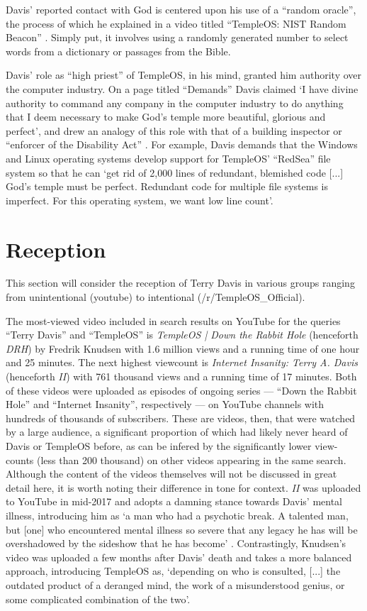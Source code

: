 \documentclass[Draft.tex]{subfiles}
\begin{document}
Davis' reported contact with God is centered upon his use of
a ``random oracle'', the process of which he explained in a video titled
``TempleOS: NIST Random Beacon'' \parencite{NIST}.
Simply put, it involves using a randomly generated number to select
words from a dictionary or passages from the Bible.

Davis' role as ``high priest'' of TempleOS, in his mind, granted him authority
over the computer industry.
On a page titled ``Demands'' Davis claimed
`I have divine authority to command any company in the computer industry
to do anything that I deem necessary
to make God's temple more beautiful, glorious and perfect',
and drew an analogy of this role with that of a building inspector
or ``enforcer of the Disability Act'' \parencite{Demands}.
For example, Davis demands that the Windows and Linux operating systems
develop support for TempleOS' ``RedSea'' file system so that he can
`get rid of 2,000 lines of redundant, blemished code [...]
God's temple must be perfect.  Redundant code for multiple file systems
is imperfect.  For this operating system, we want low line count'.

\section*{Reception}
This section will consider the reception of Terry Davis in various groups
ranging from unintentional (youtube) to intentional (/r/TempleOS\_Official).

The most-viewed video included in search results on YouTube
for the queries ``Terry Davis'' and ``TempleOS'' is
\textit{TempleOS | Down the Rabbit Hole} (henceforth \textit{DRH})
by Fredrik Knudsen with 1.6 million views
and a running time of one hour and 25 minutes.
The next highest viewcount is \textit{Internet Insanity: Terry A. Davis}
(henceforth \textit{II}) with 761 thousand views and a running time of 17 minutes.
Both of these videos were uploaded as episodes of ongoing series
--- ``Down the Rabbit Hole'' and ``Internet Insanity'', respectively ---
on YouTube channels with hundreds of thousands of subscribers.
These are videos, then, that were watched by a large audience,
a significant proportion of which had likely never heard of Davis
or TempleOS before, as can be infered
by the significantly lower view-counts (less than 200 thousand)
on other videos appearing in the same search.
Although the content of the videos themselves
will not be discussed in great detail here,
it is worth noting their difference in tone for context.
\textit{II} was uploaded to YouTube in mid-2017 and adopts a damning stance
towards Davis' mental illness, introducing him as
`a man who had a psychotic break.
A talented man, but [one] who encountered mental illness so severe
that any legacy he has will be overshadowed
by the sideshow that he has become' \parencite*{Metokur17}.
Contrastingly, Knudsen's \parencite*{Knudsen18} video
was uploaded a few months after Davis' death and
takes a more balanced approach, introducing TempleOS as,
`depending on who is consulted, [...] the outdated product of a deranged mind,
the work of a misunderstood genius, or some complicated combination of the two'.
\end{document}
